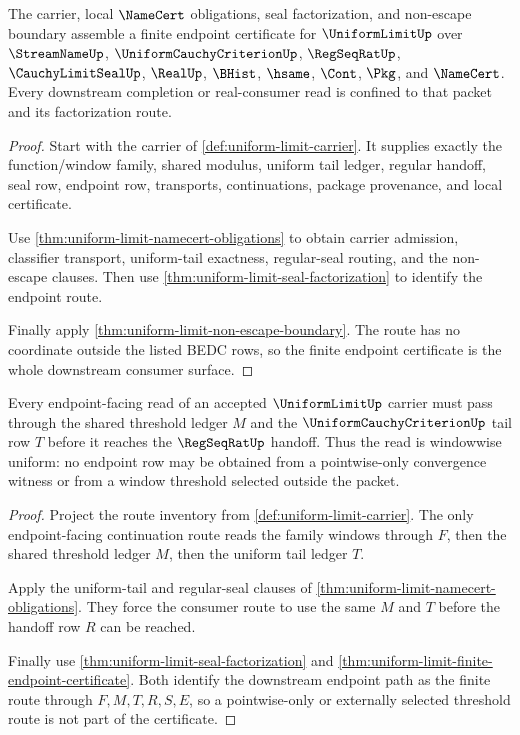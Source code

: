 \begin{theorem}
\label{thm:uniform-limit-finite-endpoint-certificate}
The carrier, local $\NameCert$ obligations, seal factorization, and non-escape boundary assemble a finite endpoint certificate for $\UniformLimitUp$ over $\StreamNameUp$, $\UniformCauchyCriterionUp$, $\RegSeqRatUp$, $\CauchyLimitSealUp$, $\RealUp$, $\BHist$, $\hsame$, $\Cont$, $\Pkg$, and $\NameCert$. Every downstream completion or real-consumer read is confined to that packet and its factorization route.
\end{theorem}
\begin{proof}
Start with the carrier of \autoref{def:uniform-limit-carrier}. It supplies exactly the function/window family, shared modulus, uniform tail ledger, regular handoff, seal row, endpoint row, transports, continuations, package provenance, and local certificate.

Use \autoref{thm:uniform-limit-namecert-obligations} to obtain carrier admission, classifier transport, uniform-tail exactness, regular-seal routing, and the non-escape clauses. Then use \autoref{thm:uniform-limit-seal-factorization} to identify the endpoint route.

Finally apply \autoref{thm:uniform-limit-non-escape-boundary}. The route has no coordinate outside the listed BEDC rows, so the finite endpoint certificate is the whole downstream consumer surface.
\end{proof}

\begin{theorem}
\label{thm:uniform-limit-windowwise-cauchy-obligation}
Every endpoint-facing read of an accepted $\UniformLimitUp$ carrier must pass through the shared threshold ledger $M$ and the $\UniformCauchyCriterionUp$ tail row $T$ before it reaches the $\RegSeqRatUp$ handoff. Thus the read is windowwise uniform: no endpoint row may be obtained from a pointwise-only convergence witness or from a window threshold selected outside the packet.
\end{theorem}
\begin{proof}
Project the route inventory from \autoref{def:uniform-limit-carrier}. The only endpoint-facing continuation route reads the family windows through $F$, then the shared threshold ledger $M$, then the uniform tail ledger $T$.

Apply the uniform-tail and regular-seal clauses of \autoref{thm:uniform-limit-namecert-obligations}. They force the consumer route to use the same $M$ and $T$ before the handoff row $R$ can be reached.

Finally use \autoref{thm:uniform-limit-seal-factorization} and \autoref{thm:uniform-limit-finite-endpoint-certificate}. Both identify the downstream endpoint path as the finite route through $F,M,T,R,S,E$, so a pointwise-only or externally selected threshold route is not part of the certificate.
\end{proof}

